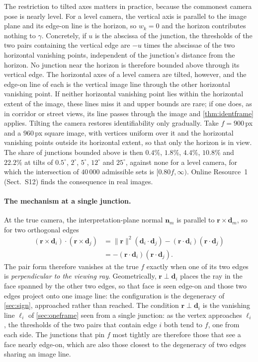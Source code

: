 \documentclass[pdflatex,sn-mathphys-num,iicol]{sn-jnl}
\newcommand{\vd}{\mathbf{d}}
\newcommand{\vr}{\mathbf{r}}
\newcommand{\vn}{\mathbf{n}}
\newcommand{\OR}{Online Resource~1}
\theoremstyle{thmstyleone}
\theoremstyle{thmstylethree}
\theoremstyle{thmstyletwo}
\begin{document}
The restriction to tilted axes matters in practice, because the commonest camera pose is nearly level. For a level camera, the vertical axis is parallel to the image plane and its edge-on line is the horizon, so $w_k=0$ and the horizon contributes nothing to $\gamma$. Concretely, if $u$ is the abscissa of the junction, the thresholds of the two pairs containing the vertical edge are $-u$ times the abscissae of the two horizontal vanishing points, independent of the junction's distance from the horizon. No junction near the horizon is therefore bounded above through its vertical edge. The horizontal axes of a level camera are tilted, however, and the edge-on line of each is the vertical image line through the other horizontal vanishing point. If neither horizontal vanishing point lies within the horizontal extent of the image, these lines miss it and upper bounds are rare; if one does, as in corridor or street views, its line passes through the image and \cref{thm:identframe} applies. Tilting the camera restores identifiability only gradually. Take $f=900$\,px and a $960$\,px square image, with vertices uniform over it and the horizontal vanishing points outside its horizontal extent, so that only the horizon is in view. The share of junctions bounded above is then $0.4\%$, $1.8\%$, $4.4\%$, $10.8\%$ and $22.2\%$ at tilts of $0.5^\circ$, $2^\circ$, $5^\circ$, $12^\circ$ and $25^\circ$, against none for a level camera, for which the intersection of $40\,000$ admissible sets is $[0.80f,\infty)$. \OR{} (Sect.~S12) finds the consequence in real images.

\paragraph{The mechanism at a single junction.} At the true camera, the interpretation-plane normal $\vn_m$ is parallel to $\vr\times\vd_m$, so for two orthogonal edges
\begin{equation}
\begin{aligned}
(\vr\times\vd_i)\cdot(\vr\times\vd_j)&=\|\vr\|^2(\vd_i\cdot\vd_j)-(\vr\cdot\vd_i)(\vr\cdot\vd_j)\\
&=-(\vr\cdot\vd_i)(\vr\cdot\vd_j).
\end{aligned}
\label{eq:edgeon}
\end{equation}
The pair form therefore vanishes at the true $f$ exactly when one of its two edges is \emph{perpendicular to the viewing ray}. Geometrically, $\vr\perp\vd_i$ places the ray in the face spanned by the other two edges, so that face is seen edge-on and those two edges project onto one image line: the configuration is the degeneracy of \cref{sec:sign}, approached rather than reached. The condition $\vr\perp\vd_i$ is the vanishing line $\ell_i$ of \cref{sec:oneframe} seen from a single junction: as the vertex approaches $\ell_i$, the thresholds of the two pairs that contain edge $i$ both tend to $f$, one from each side. The junctions that pin $f$ most tightly are therefore those that see a face nearly edge-on, which are also those closest to the degeneracy of two edges sharing an image line. 
\end{document}
